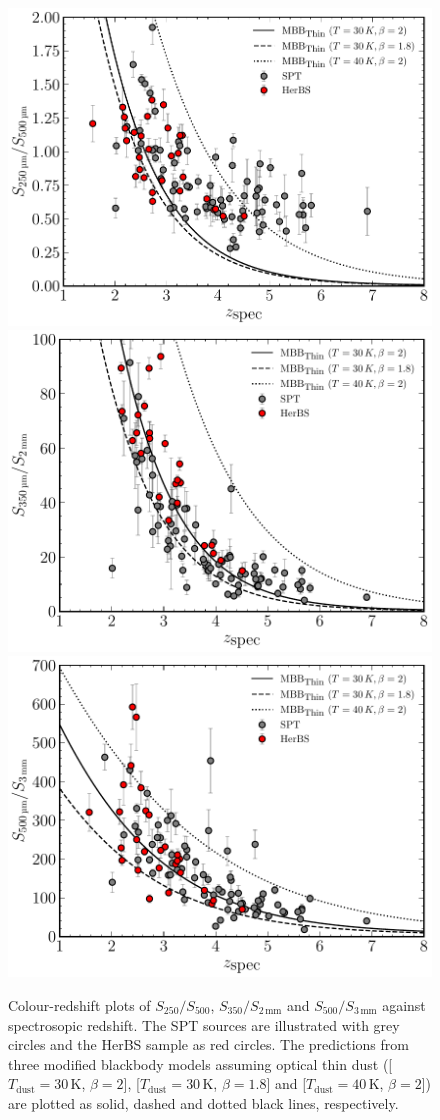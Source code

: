 \begin{figure}
    \centering
    \includegraphics[width=0.55\columnwidth,height=0.29\textheight]{Figures/spt_herbs_colour_250_500.pdf}
    \includegraphics[width=0.55\columnwidth,height=0.29\textheight]{Figures/spt_herbs_colour_350_2000.pdf}
    \includegraphics[width=0.55\columnwidth,height=0.29\textheight]{Figures/spt_herbs_colour_500_3000.pdf}
    \caption[Colours of HerBS and SPT sources as a function of redshift]{Colour-redshift plots of $S_{250}/S_{500}$, $S_{350}/S_{2\,\textrm{mm}}$ and $S_{500}/S_{3\,\textrm{mm}}$ against spectrosopic redshift. The SPT sources are illustrated with grey circles and the HerBS sample as red circles. The predictions from three modified blackbody models assuming optical thin dust ([$T_{\textrm{dust}} = 30\,$K, $\beta = 2$], [$T_{\textrm{dust}} = 30\,$K, $\beta = 1.8$] and [$T_{\textrm{dust}} = 40\,$K, $\beta = 2$]) are plotted as solid, dashed and dotted black lines, respectively.}
    \label{fig:spt_herbs_colour_redshift}
\end{figure}

